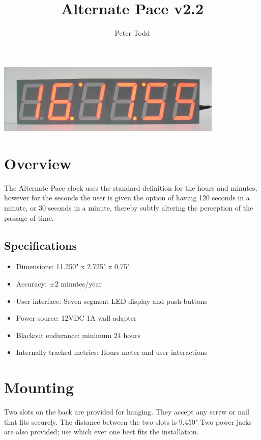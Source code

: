 \documentclass{article}
\title{Alternate Pace v2.2}
\author{Peter Todd}
\date{}
\begin{document}
   \maketitle

\includegraphics[width=4.25in]{figures/front-running-24hr.eps}

\section{Overview}

The Alternate Pace clock uses the standard definition for the hours and
minutes, however for the seconds the user is given the option of having 120
seconds in a minute, or 30 seconds in a minute, thereby subtly altering the
perception of the passage of time.

\subsection{Specifications}

\begin{itemize}
	\item Dimensions: 11.250" x 2.725" x 0.75"
	\item Accuracy: ${\pm}$2 minutes/year
	\item User interface: Seven segment LED display and push-buttons
	\item Power source: 12VDC 1A wall adapter
	\item Blackout endurance: minimum 24 hours
	\item Internally tracked metrics: Hours meter and user interactions
\end{itemize}

\section{Mounting}

Two slots on the back are provided for hanging. They accept any screw or nail
that fits securely. The distance between the two slots is 9.450" Two power
jacks are also provided; use which ever one best fits the installation.
\end{document}
